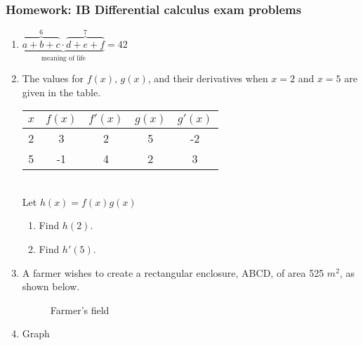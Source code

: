 \documentclass[12pt, twoside]{article}
\begin{document}
\subsubsection*{Homework: IB Differential calculus exam problems}

\begin{enumerate}
\item 
$\underbrace{\overbrace{a+b+c}^6
 \cdot \overbrace{d+e+f}^7}
 _\text{meaning of life} = 42$

\item The values for $f(x)$, $g(x)$, and their derivatives when $x=2$ and $x=5$ are given in the table. \\[0.5cm]
\begin{tabular}{|c|c|c|c|c|}
  \hline
  $x$ & $f(x)$ & $f'(x)$ & $g(x)$ & $g'(x)$ \\
  \hline
  2 & 3 & 2 & 5 & -2 \\
  \hline
  5 & -1 & 4 & 2 & 3 \\
  \hline
\end{tabular}\\[0.5cm]
Let $h(x)=f(x)g(x)$
\begin{enumerate}
  \item Find $h(2)$.
  \item Find $h'(5)$.
\end{enumerate}


\item A farmer wishes to create a rectangular enclosure, ABCD, of area 525 $m^2$, as shown below.
  \begin{figure}[!htbp]
    \caption{Farmer's field}
  \begin{center}
  \end{center}
  \end{figure}

\item Graph
\begin{figure}[!htbp]
  \begin{center}
  \end{center}
\end{figure}


\end{enumerate}
\end{document}
